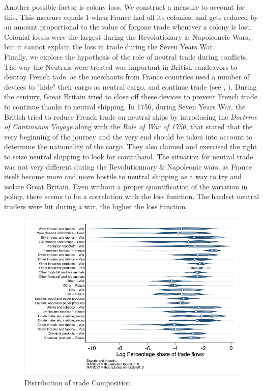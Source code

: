\documentclass[12pt,a4paper,notitlepage]{article}
\begin{document}
Another possible factor is colony loss. We construct a measure to account for this.
This measure equals 1 when France had all its colonies, and gets reduced by an amount proportional to the value of forgone trade whenever a colony is lost.
Colonial losses were the largest during the Revolutionary \& Napoleoncic Wars, but it cannot explain the loss in trade during the Seven Years War. \\
Finally, we explore the hypothesis of the role of neutral trade during conflicts. 
The way the Neutrals were treated was important in British eandeavors to destroy French tade, as the merchants from France countries used a number of devices to "hide" their cargo as neutral cargo, and continue trade (see \citep{carriere1973negociants}, \cite{schnakenbourg2013guerre}). 
During the century, Great Britain tried to close off these devices to prevent French trade to continue thanks to neutral shipping.
In 1756, during Seven Years War, the British tried to reduce French trade on neutral ships by introducing the \textit{Doctrine of Continuous Voyage} along with the \textit{Rule of War of 1756}, that stated that the very beginning of the journey and the very end should be taken into account to determine the nationality of the cargo.
They also claimed and exercised the right to seize neutral shipping to look for contraband.
The situation for neutral trade was not very different during the Revolutionnary \& Napoleonic wars, as France itself become more and more hostile to neutral shipping as a way to try and isolate Great Britain. Even without a proper quantification of the variation in policy, there seems to be a correlation with the loss function. The hardest neutral traders were hit during a war, the higher the loss function. 
\begin{figure}
\includegraphics[scale=.7]{peace_war_national_distribution_XI.pdf}
\caption{Distribution of trade Composition}
\label{peace_war_national_distribution_XI}
\end{figure}
\end{document}
